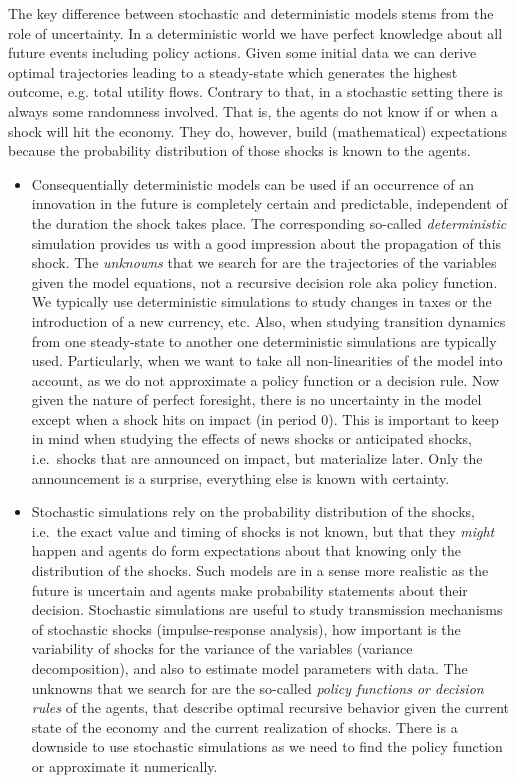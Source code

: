 The key difference between stochastic and deterministic models stems from the role of uncertainty.
  In a deterministic world we have perfect knowledge about all future events including policy actions.
Given some initial data we can derive optimal trajectories leading to a steady-state which generates the highest outcome, e.g. total utility flows.
Contrary to that, in a stochastic setting there is always some randomness involved.
That is, the agents do not know if or when a shock will hit the economy.
They do, however, build (mathematical) expectations because the probability distribution of those shocks is known to the agents.
\begin{itemize}
\item     
Consequentially deterministic models can be used if an occurrence of an innovation in the future is completely certain and predictable,
  independent of the duration the shock takes place.
The corresponding so-called \emph{deterministic} simulation provides us with a good impression about the propagation of this shock.
The \emph{unknowns} that we search for are the trajectories of the variables given the model equations,
  not a recursive decision role aka policy function.
We typically use deterministic simulations to study changes in taxes
  or the introduction of a new currency, etc.
Also, when studying transition dynamics from one steady-state to another one deterministic simulations are typically used.
Particularly, when we want to take all non-linearities of the model into account,
  as we do not approximate a policy function or a decision rule.
Now given the nature of perfect foresight,
  there is no uncertainty in the model except when a shock hits on impact (in period 0).
This is important to keep in mind when studying the effects of news shocks or anticipated shocks,
  i.e.\ shocks that are announced on impact, but materialize later.
Only the announcement is a surprise,
  everything else is known with certainty.

\item  
Stochastic simulations rely on the probability distribution of the shocks,
  i.e.\ the exact value and timing of shocks is not known,
  but that they \emph{might} happen and agents do form expectations about that knowing only the distribution of the shocks.
Such models are in a sense more realistic as the future is uncertain
  and agents make probability statements about their decision.
Stochastic simulations are useful to study transmission mechanisms of stochastic shocks (impulse-response analysis),
  how important is the variability of shocks for the variance of the variables (variance decomposition),
  and also to estimate model parameters with data.
The unknowns that we search for are the so-called \emph{policy functions or decision rules} of the agents,
  that describe optimal recursive behavior given the current state of the economy and the current realization of shocks.
There is a downside to use stochastic simulations
  as we need to find the policy function or approximate it numerically.

\end{itemize}